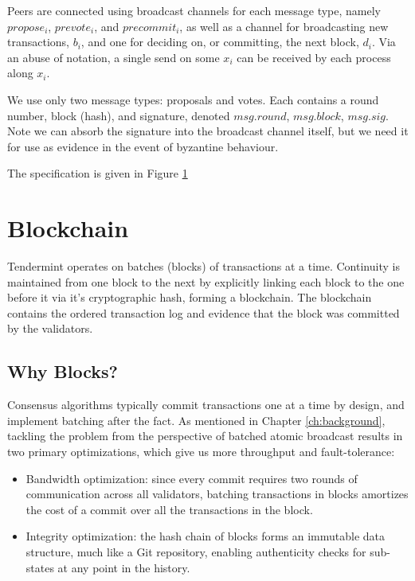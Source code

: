 Peers are connected using broadcast channels for each message type,
namely $propose_i$, $prevote_i$, and $precommit_i$,
as well as a channel for broadcasting new transactions, $b_i$,
and one for deciding on, or committing, the next block, $d_i$.
Via an abuse of notation, a single send on some $x_i$ can be received by each process along
$x_i$.

We use only two message types: proposals and votes. 
Each contains a round number, block (hash), and signature, 
denoted $msg.round$, $msg.block$, $msg.sig$.
Note we can absorb the signature into the broadcast channel itself,
but we need it for use as evidence in the event of byzantine behaviour.

The specification is given in Figure \ref{fig:tendermint-pi}

\begin{figure}[]
	
	\label{fig:tendermint-pi}
\end{figure}

\section{Blockchain}

Tendermint operates on batches (blocks) of transactions at a time.
Continuity is maintained from one block to the next by explicitly linking each block to the one before it 
via it's cryptographic hash, forming a blockchain. 
The blockchain contains the ordered transaction log and evidence that the block was committed 
by the validators.

\subsection{Why Blocks?}
Consensus algorithms typically commit transactions one at a time by design, 
and implement batching after the fact.
As mentioned in Chapter \ref{ch:background}, 
tackling the problem from the perspective of batched atomic broadcast
results in two primary optimizations, which give us more throughput and fault-tolerance:

\begin{itemize}
\item{Bandwidth optimization: since every commit requires two rounds of communication across all validators, 
	batching transactions in blocks amortizes the cost of a commit over all the transactions in the block.}
\item{Integrity optimization: the hash chain of blocks forms an immutable data structure, much like a Git repository, enabling authenticity checks for sub-states at any point in the history.}
\end{itemize}

